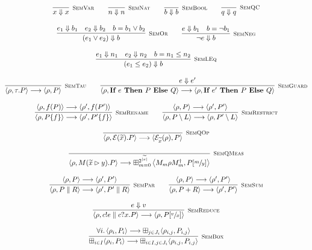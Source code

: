   \begin{gather*}
    \infer[\mbox{\footnotesize\scshape SemVar}]{x \Downarrow x}{} \qquad
    \infer[\mbox{\footnotesize\scshape SemNat}]{n \Downarrow n}{} \qquad
    \infer[\mbox{\footnotesize\scshape SemBool}]{b \Downarrow b}{}  \qquad
    \infer[\mbox{\footnotesize\scshape SemQC}]{q \Downarrow q}{} \\[0.3cm]
    \infer[\mbox{\footnotesize\scshape SemOr}]{(e_1 \lor e_2) \Downarrow b}{e_1 \Downarrow b_1 & e_2 \Downarrow b_2 & b = b_1 \lor b_2} \qquad
    \infer[\mbox{\footnotesize\scshape SemNeg}]{\neg e \Downarrow b}{e \Downarrow b_1 & b = \neg b_1} \\[0.3cm]
    \infer[\mbox{\footnotesize\scshape SemLEq}]{(e_1 \leq e_2) \Downarrow b}{e_1 \Downarrow n_1 & e_2 \Downarrow n_2 & b = n_1 \leq n_2} \\[0.3cm]
    \infer[\mbox{\footnotesize\scshape SemTau}]{\langle \rho, \tau . P \rangle \longrightarrow \langle \rho, P \rangle}{} \qquad
    \infer[\mbox{\footnotesize\scshape SemGuard}]{\langle \rho, \ITE{e}{P}{Q} \rangle \longrightarrow \langle \rho, \ITE{e'}{P}{Q} \rangle}{e \Downarrow e'} \\[0.3cm]
    \infer[\mbox{\footnotesize\scshape SemRename}]{\langle \rho, P \{f\} \rangle \longrightarrow \langle \rho', P' \{f\}\rangle}{\langle \rho, f(P) \rangle \longrightarrow \langle \rho', f(P') \rangle} \qquad
    \infer[\mbox{\footnotesize\scshape SemRestrict}]{\langle \rho, P \setminus L \rangle \longrightarrow \langle \rho, P' \setminus L \rangle}{\langle \rho, P \rangle \longrightarrow \langle \rho', P' \rangle} \\[0.3cm]
    \infer[\mbox{\footnotesize\scshape SemQOp}]{\langle \rho, \mathcal{E}(\widetilde{x}) . P \rangle \longrightarrow \langle \mathcal{E}_{\widetilde{x}}(\rho), P \rangle}{} \\[0.3cm]
    \infer[\mbox{\footnotesize\scshape SemQMeas}]{\langle \rho, M(\widetilde{x} \rhd y) . P \rangle \longrightarrow \boxplus_{m = 0}^{2^{|\widetilde{x}|}} \left\langle {M_m \rho M_m^\dag}, P[\sfrac{m}{y}] \right\rangle}{} \\[0.3cm]
    \infer[\mbox{\footnotesize\scshape SemPar}]{\langle \rho, P \parallel R \rangle \longrightarrow \langle \rho', P' \parallel R \rangle}{\langle \rho, P \rangle \longrightarrow \langle \rho', P' \rangle} \qquad
    \infer[\mbox{\footnotesize\scshape SemSum}]{\langle \rho, P + R \rangle \longrightarrow \langle \rho', P' \rangle}{\langle \rho, P \rangle \longrightarrow \langle \rho', P' \rangle} \\[0.3cm]
    \infer[\mbox{\footnotesize\scshape SemReduce}]{\langle \rho, c!e \parallel c?x . P \rangle \longrightarrow \langle \rho, P[\sfrac{v}{x}] \rangle}{e \Downarrow v} \\[0.3cm]
    \infer[\mbox{\footnotesize\scshape SemBox}]{\boxplus_{i \in I}\langle \rho_i, P_i \rangle \longrightarrow \boxplus_{i \in I, j \in J_i}\langle \rho_{i, j},P_{i, j} \rangle}
          {\forall i \ldotp \langle \rho_i, P_i \rangle \longrightarrow \boxplus_{j \in J_i} \langle\rho_{i, j},P_{i, j}\rangle}
  \end{gather*}
  
